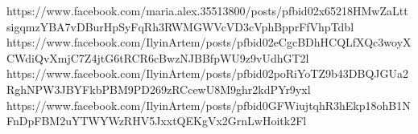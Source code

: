  
 
 
 
 

https://www.facebook.com/maria.alex.35513800/posts/pfbid02x65218HMwZaLttsigqmzYBA7vDBurHpSyFqRh3RWMGWVcVD3cVphBpprFfVhpTdbl
https://www.facebook.com/IlyinArtem/posts/pfbid02eCgcBDhHCQLfXQc3woyXCWdiQvXmjC7Z4jtG6tRCR6cBwzNJBBfpWU9z9vUdhGT2l
https://www.facebook.com/IlyinArtem/posts/pfbid02poRiYoTZ9b43DBQJGUa2RghNPW3JBYFkbPBM9PD269zRCcewU8M9ghr2kdPYr9yxl
https://www.facebook.com/IlyinArtem/posts/pfbid0GFWiujtqhR3hEkp18ohB1NFnDpFBM2uYTWYWzRHV5JxxtQEKgVx2GrnLwHoitk2Fl

